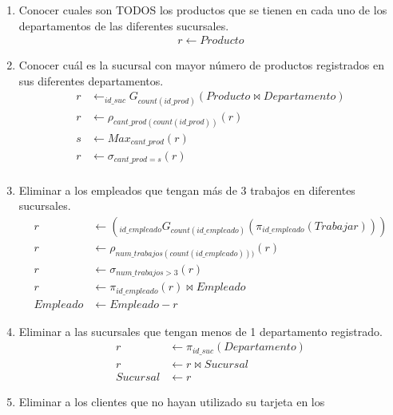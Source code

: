 \documentclass{article}
\begin{document}
\begin{enumerate}
{        }
        \item {
            Conocer cuales son TODOS los productos que se tienen en cada uno de
            los departamentos de las diferentes sucursales.
            \begin{align*}
                r \leftarrow Producto
            \end{align*}
        }
        \item {
            Conocer cuál es la sucursal con mayor número de productos
            registrados en sus diferentes departamentos.
            \begin{align*}
            r &\leftarrow _{id\_suc}G_{count(id\_prod)}(Producto \bowtie Departamento)\\
            r &\leftarrow \rho_{cant\_prod(count(id\_prod))}(r)\\
            s &\leftarrow Max_{cant\_prod}(r)\\
            r &\leftarrow \sigma_{cant\_prod=s}(r)\\
            \end{align*}
        }
        \item {
            Eliminar a los empleados que tengan más de 3 trabajos en diferentes 
            sucursales.
            \begin{align*}
                r &\leftarrow (_{id\_empleado}G_{count(id\_empleado)}
                (\pi_{id\_empleado}(Trabajar))) \\
                r &\leftarrow \rho_{num\_trabajos(count(id\_empleado)))}(r)\\
                r &\leftarrow \sigma_{num\_trabajos>3}(r)\\
                r &\leftarrow \pi_{id\_empleado}(r) \bowtie Empleado \\
                Empleado &\leftarrow Empleado - r
            \end{align*}
        }
        \item {
            Eliminar a las sucursales que tengan menos de 1 departamento
            registrado.
            \begin{align*}
                r &\leftarrow \pi_{id\_suc}(Departamento)\\
                r &\leftarrow r \bowtie Sucursal \\
                Sucursal &\leftarrow r
            \end{align*}
        }
        \item {
            Eliminar a los clientes que no hayan utilizado su tarjeta en los
}
\end{enumerate}
\end{document}
